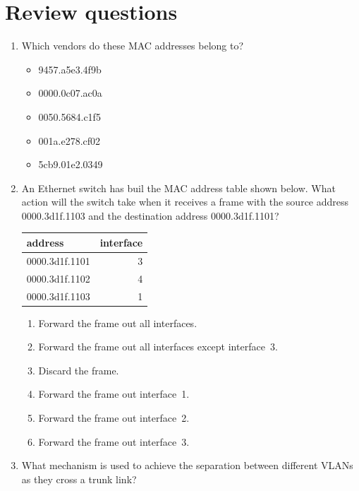 \section{Review questions}
\label{sec:ethernet-review-questions}
\begin{enumerate}
\item Which vendors do these \acs{MAC} addresses belong to?
   \begin{itemize}
   \item 9457.a5e3.4f9b
   \item 0000.0c07.ac0a
   \item 0050.5684.c1f5
   \item 001a.e278.cf02
   \item 5cb9.01e2.0349
   \end{itemize}
\item
   An Ethernet switch has buil the \acs{MAC} address table shown below.
   What action will the switch take when it receives a frame with the source address 0000.3d1f.1103 and the destination address 0000.3d1f.1101?
   \begin{center}
   \begin{tabular}{lr}
   address & interface \\
   \midrule
   0000.3d1f.1101 & 3 \\
   0000.3d1f.1102 & 4 \\
   0000.3d1f.1103 & 1 \\
   \end{tabular}
   \end{center}
   \begin{enumerate}
   \item Forward the frame out all interfaces.
   \item Forward the frame out all interfaces except interface~3.
   \item Discard the frame.
   \item Forward the frame out interface~1.
   \item Forward the frame out interface~2.
   \item Forward the frame out interface~3.
   \end{enumerate}
\item
   What mechanism is used to achieve the separation between different \acsp{VLAN} as they cross a trunk link?

\end{enumerate}
